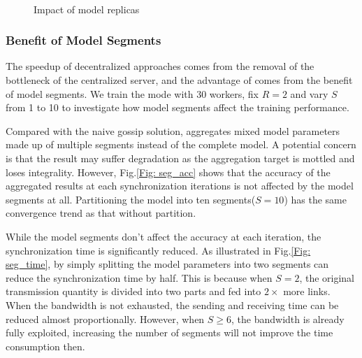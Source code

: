 \begin{figure}[htbp]
\begin{minipage}[t]{0.32\linewidth}
\\

\caption{Impact of model replicas}
\label{Fig: acc}
\end{minipage}

\end{figure}



\subsubsection{Benefit of Model Segments}
The speedup of decentralized approaches comes from the removal of the bottleneck of the centralized server, and the advantage of \sys comes from the benefit of model segments. We train the mode with 30 workers, fix $R=2$ and vary $S$ from 1 to 10 to investigate how model segments affect the training performance.

Compared with the naive gossip solution, \sys aggregates mixed model parameters made up of multiple segments instead of the complete model. A potential concern is that the result may suffer degradation as the aggregation target is mottled and loses integrality. However, Fig.\ref{Fig: seg_acc} shows that the accuracy of the aggregated results at each synchronization iterations is not affected by the model segments at all. Partitioning the model into ten segments($S=10$) has the same convergence trend as that without partition.

While the model segments don't affect the accuracy at each iteration, the synchronization time is significantly reduced. As illustrated in Fig.\ref{Fig: seg_time}, by simply splitting the model parameters into two segments can reduce the synchronization time by half. This is because when $S=2$, the original transmission quantity is divided into two parts and fed into $2\times$ more links. When the bandwidth is not exhausted, the sending and receiving time can be reduced almost proportionally. However, when $S\geq 6$, the bandwidth is already fully exploited, increasing the number of segments will not improve the time consumption then.


